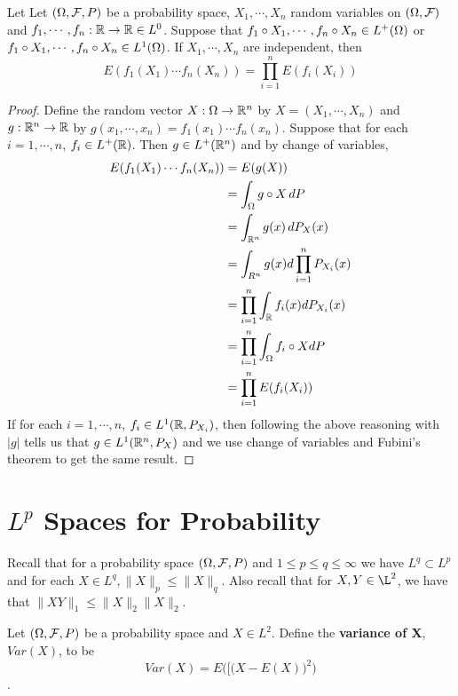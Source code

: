\documentclass{book}
\begin{document}
	\begin{ex}
		Let Let $(\Omega, \mathcal{F}, P)$ be a probability space, $X_1, \cdots, X_n$ random variables on $(\Omega, \mathcal{F})$ and $f_1, \cdots, f_n: \mathbb{R} \rightarrow \mathbb{R} \in L^0$. Suppose that $f_1 \circ X_1, \cdots, f_n \circ X_n\in L^+(\Omega)$ or $f_1 \circ X_1, \cdots, f_n \circ X_n \in L^1(\Omega)$. If $X_1, \cdots, X_n$ are independent, then $$E(f_1(X_1) \cdots f_n(X_n)) = \prod_{i=1}^n E(f_i(X_i))$$
	\end{ex}
	
	\begin{proof}
		Define the random vector $X : \Omega \rightarrow \mathbb{R}^n$ by $X = (X_1, \cdots, X_n)$ and $g:\mathbb{R}^n \rightarrow \mathbb{R}$ by $g(x_1, \cdots, x_n) = f_1(x_1) \cdots f_n(x_n)$. Suppose that for each $i = 1, \cdots, n$, $f_i \in L^+(\mathbb{R})$. Then $g \in L^+(\mathbb{R}^n)$ and by change of variables,  
		\begin{align*}
			E(f_1(X_1) \cdots f_n(X_n)) 
			&= E(g(X)) \\
			&= \int_{\Omega} g \circ X \, d P \\
			&= \int_{\mathbb{R}^n} g(x) \, d P_X(x) \\
			&= \int_{R^n} g(x) d \prod\limits_{i=1}^nP_{X_i}(x) \\
			&=  \prod_{i=1}^n \int_{\mathbb{R}}f_i(x) d P_{X_i}(x) \\ 
			&= \prod_{i=1}^n \int_{\Omega}f_i \circ X d P \\
			&= \prod_{i=1}^n E(f_i(X_i))
		\end{align*}
		If for each $i = 1, \cdots, n$, $f_i \in L^1(\mathbb{R}, P_{X_i})$, then following the above reasoning with $\vert g \vert $ tells us that $g \in L^1(\mathbb{R}^n, P_X)$ and we use change of variables and Fubini's theorem to get the same result.  
	\end{proof}
	
	\section{$L^p$ Spaces for Probability}
	
	\begin{note}
		Recall that for a probability space $(\Omega, \mathcal{F}, P)$ and $1 \leq p \leq q \leq \infty$ we have $L^q \subset L^p$ and for each $X \in L^q, \|X \|_p \leq  \|X\|_q$. Also recall that for $X,Y \in \L^2$, we have that $\|XY \|_1 \leq \|X\|_2 \|X\|_2$.
	\end{note}
	
	\begin{defn}
		Let $(\Omega, \mathcal{F}, P)$ be a probability space and $X \in L^2$. Define the \textbf{variance of X}, $Var(X)$, to be $$Var(X) = E(\big[\big(X-E(X)\big)^2\big)$$.
	\end{defn}
	
\end{document}
